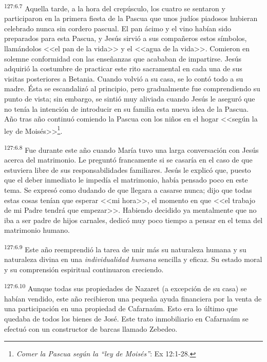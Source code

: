 \par 
\textsuperscript{127:6.7} Aquella tarde, a la hora del crepúsculo, los cuatro se sentaron y participaron en la primera fiesta de la Pascua que unos judíos piadosos hubieran celebrado nunca sin cordero pascual. El pan ácimo y el vino habían sido preparados para esta Pascua, y Jesús sirvió a sus compañeros estos símbolos, llamándolos <<el pan de la vida>> y el <<agua de la vida>>. Comieron en solemne conformidad con las enseñanzas que acababan de impartirse. Jesús adquirió la costumbre de practicar este rito sacramental en cada una de sus visitas posteriores a Betania. Cuando volvió a su casa, se lo contó todo a su madre. Ésta se escandalizó al principio, pero gradualmente fue comprendiendo su punto de vista; sin embargo, se sintió muy aliviada cuando Jesús le aseguró que no tenía la intención de introducir en su familia esta nueva idea de la Pascua. Año tras año continuó comiendo la Pascua con los niños en el hogar <<según la ley de Moisés>>\footnote{\textit{Comer la Pascua según la ``ley de Moisés''}: Ex 12:1-28.}.

\par 
\textsuperscript{127:6.8} Fue durante este año cuando María tuvo una larga conversación con Jesús acerca del matrimonio. Le preguntó francamente si se casaría en el caso de que estuviera libre de sus responsabilidades familiares. Jesús le explicó que, puesto que el deber inmediato le impedía el matrimonio, había pensado poco en este tema. Se expresó como dudando de que llegara a casarse nunca; dijo que todas estas cosas tenían que esperar <<mi hora>>, el momento en que <<el trabajo de mi Padre tendrá que empezar>>. Habiendo decidido ya mentalmente que no iba a ser padre de hijos carnales, dedicó muy poco tiempo a pensar en el tema del matrimonio humano.

\par 
\textsuperscript{127:6.9} Este año reemprendió la tarea de unir más su naturaleza humana y su naturaleza divina en una \textit{individualidad humana} sencilla y eficaz. Su estado moral y su comprensión espiritual continuaron creciendo.

\par 
\textsuperscript{127:6.10} Aunque todas sus propiedades de Nazaret (a excepción de su casa) se habían vendido, este año recibieron una pequeña ayuda financiera por la venta de una participación en una propiedad de Cafarnaúm. Esto era lo último que quedaba de todos los bienes de José. Este trato inmobiliario en Cafarnaúm se efectuó con un constructor de barcas llamado Zebedeo.

